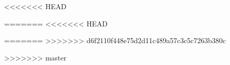 



\tableofcontents{}
\pagebreak


\pagebreak
<<<<<<< HEAD

\pagebreak

\pagebreak
=======
<<<<<<< HEAD


\newpage

=======
>>>>>>> d6f2110f448e75d2d11c489a57c3c5c7263b380c

\pagebreak
>>>>>>> master


